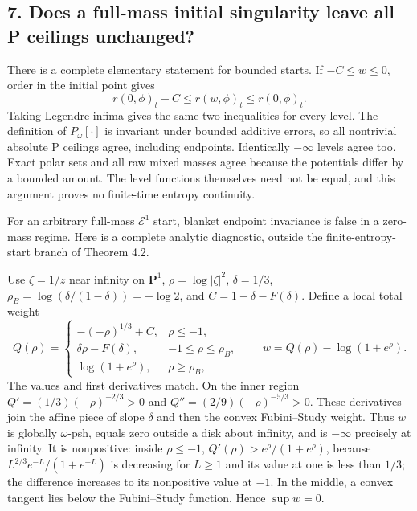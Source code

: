 \documentclass[
  11pt,
]{article}
\begin{document}
\subsection{7. Does a full-mass initial singularity leave all P ceilings
unchanged?}\label{does-a-full-mass-initial-singularity-leave-all-p-ceilings-unchanged}

There is a complete elementary statement for bounded starts. If
\(-C\leq w\leq0\), order in the initial point gives
\[ r(0,\phi)_t-C\leq r(w,\phi)_t\leq r(0,\phi)_t.\] Taking Legendre
infima gives the same two inequalities for every level. The definition
of \(P_\omega[\cdot]\) is invariant under bounded additive errors, so
all nontrivial absolute P ceilings agree, including endpoints.
Identically \(-\infty\) levels agree too. Exact polar sets and all raw
mixed masses agree because the potentials differ by a bounded amount.
The level functions themselves need not be equal, and this argument
proves no finite-time entropy continuity.

For an arbitrary full-mass \(\mathcal E^1\) start, blanket endpoint
invariance is false in a zero-mass regime. Here is a complete analytic
diagnostic, outside the finite-entropy-start branch of Theorem 4.2.

Use \(\zeta=1/z\) near infinity on \(\mathbf P^1\),
\(\rho=\log|\zeta|^2\), \(\delta=1/3\),
\(\rho_B=\log(\delta/(1-\delta))=-\log2\), and \(C=1-\delta-F(\delta)\).
Define a local total weight \[
 Q(\rho)=
 \begin{cases}
 -(-\rho)^{1/3}+C,&\rho\leq-1,\\
 \delta\rho-F(\delta),&-1\leq\rho\leq\rho_B,\\
 \log(1+e^\rho),&\rho\geq\rho_B,
 \end{cases}
 \qquad w=Q(\rho)-\log(1+e^\rho).
 \tag{7.1}
\] The values and first derivatives match. On the inner region
\(Q'=(1/3)(-\rho)^{-2/3}>0\) and \(Q''=(2/9)(-\rho)^{-5/3}>0\). These
derivatives join the affine piece of slope \(\delta\) and then the
convex Fubini--Study weight. Thus \(w\) is globally \(\omega\)-psh,
equals zero outside a disk about infinity, and is \(-\infty\) precisely
at infinity. It is nonpositive: inside \(\rho\leq-1\),
\(Q'(\rho)>e^\rho/(1+e^\rho)\), because \(L^{2/3}e^{-L}/(1+e^{-L})\) is
decreasing for \(L\geq1\) and its value at one is less than \(1/3\); the
difference increases to its nonpositive value at \(-1\). In the middle,
a convex tangent lies below the Fubini--Study function. Hence
\(\sup w=0\).
\end{document}
